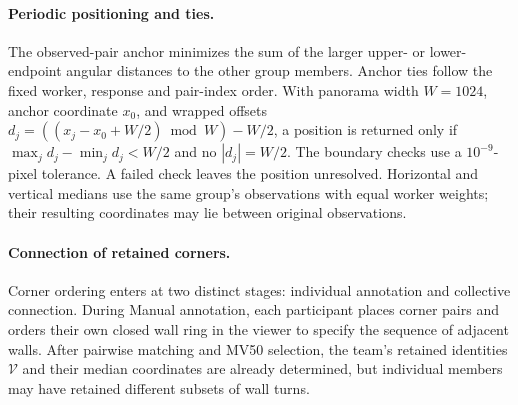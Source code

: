 \paragraph{Periodic positioning and ties.}
The observed-pair anchor minimizes the sum of the larger upper- or
lower-endpoint angular distances to the other group members. Anchor ties
follow the fixed worker, response and pair-index order. With panorama
width \(W=1024\), anchor coordinate \(x_0\), and wrapped offsets
\(d_j=((x_j-x_0+W/2)\bmod W)-W/2\), a position is returned only if
\(\max_j d_j-\min_j d_j<W/2\) and no \(|d_j|=W/2\). The boundary checks
use a \(10^{-9}\)-pixel tolerance. A failed check leaves the position
unresolved. Horizontal and vertical medians use the same group's
observations with equal worker weights; their resulting coordinates may
lie between original observations.

\paragraph{Connection of retained corners.}

Corner ordering enters at two distinct stages: individual annotation and collective connection. During Manual annotation, each participant places corner pairs and orders their own closed wall ring in the viewer to specify the sequence of adjacent walls. After pairwise matching and MV50 selection, the team's retained identities \(\mathcal V\) and their median coordinates are already determined, but individual members may have retained different subsets of wall turns.

